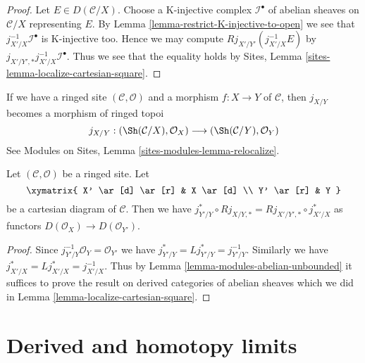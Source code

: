 \begin{proof}
Let $E \in D(\mathcal{C}/X)$. Choose a K-injective complex
$\mathcal{I}^\bullet$ of abelian sheaves on $\mathcal{C}/X$
representing $E$. By Lemma \ref{lemma-restrict-K-injective-to-open}
we see that $j_{X'/X}^{-1}\mathcal{I}^\bullet$ is K-injective too.
Hence we may compute $Rj_{X'/Y'}(j_{X'/X}^{-1}E)$ by
$j_{X'/Y', *}j_{X'/X}^{-1}\mathcal{I}^\bullet$.
Thus we see that the equality holds by
Sites, Lemma \ref{sites-lemma-localize-cartesian-square}.
\end{proof}

\noindent
If we have a ringed site $(\mathcal{C}, \mathcal{O})$
and a morphism $f : X \to Y$ of $\mathcal{C}$, then $j_{X/Y}$
becomes a morphism of ringed topoi
$$
j_{X/Y} :
(\Sh(\mathcal{C}/X), \mathcal{O}_X)
\longrightarrow
(\Sh(\mathcal{C}/Y), \mathcal{O}_Y)
$$
See Modules on Sites, Lemma \ref{sites-modules-lemma-relocalize}.

\begin{lemma}
\label{lemma-localize-cartesian-square-modules}
Let $(\mathcal{C}, \mathcal{O})$ be a ringed site. Let
$$
\xymatrix{
X' \ar[d] \ar[r] & X \ar[d] \\
Y' \ar[r] & Y
}
$$
be a cartesian diagram of $\mathcal{C}$. Then we have
$j_{Y'/Y}^* \circ Rj_{X/Y, *} = Rj_{X'/Y', *} \circ j_{X'/X}^*$
as functors
$D(\mathcal{O}_X) \to D(\mathcal{O}_{Y'})$.
\end{lemma}

\begin{proof}
Since $j_{Y'/Y}^{-1}\mathcal{O}_Y = \mathcal{O}_{Y'}$ we have
$j_{Y'/Y}^* = Lj_{Y'/Y}^* = j_{Y'/Y}^{-1}$. Similarly we have
$j_{X'/X}^* = Lj_{X'/X}^* = j_{X'/X}^{-1}$. Thus by
Lemma \ref{lemma-modules-abelian-unbounded} it suffices
to prove the result on derived categories of abelian sheaves
which we did in
Lemma \ref{lemma-localize-cartesian-square}.
\end{proof}








\section{Derived and homotopy limits}
\label{section-derived-limits}

